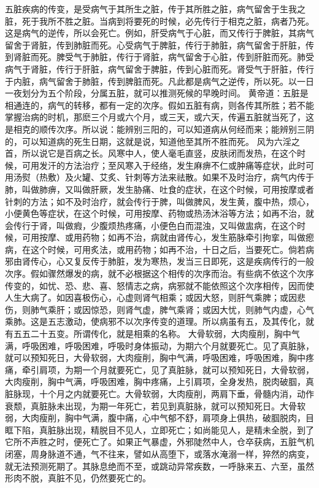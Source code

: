 \documentclass[a4paper,12pt,UTF8,twoside]{ctexbook}
\begin{document}
五脏疾病的传变，是受病气于其所生之脏，传于其所胜之脏，病气留舍于生我之脏，死于我所不胜之脏。当病到将要死的时候，必先传行于相克之脏，病者乃死。这是病气的逆传，所以会死亡。例如，肝受病气于心脏，而又传行于脾脏，其病气留舍于肾脏，传到肺脏而死。心受病气于脾脏，传行于肺脏，病气留舍于肝脏，传到肾脏而死。脾受气于肺脏，传行于肾脏，病气留舍于心脏，传到肝脏而死。肺受病气于肾脏，传行于肝脏，病气留舍于脾脏，传到心脏而死。肾受气于肝脏，传行于内脏，病气留舍于肺脏，传到脾脏而死。凡此都是病气之逆传，所以死。以一日一夜划分为五个阶段，分属五脏，就可以推测死候的早晚时间。
黄帝道：五脏是相通连的，病气的转移，都有一定的次序。假如五脏有病，则各传其所胜；若不能掌握治病的时机，那麽三个月或六个月，或三天，或六天，传遍五脏就当死了，这是相克的顺传次序。所以说：能辨别三阳的，可以知道病从何经而来；能辨别三阴的，可以知道病的死生日期，这就是说，知道他至其所不胜而死。
风为六淫之首，所以说它是百病之长。风寒中人，使人毫毛直竖，皮肤闭而发热，在这个时候，可用发汗的方法治疗；至风寒入于经络，发生麻痹不仁或肿痛等症状，此时可用汤熨（热敷）及火罐、艾炙、针刺等方法来祛散。如果不及时治疗，病气内传于肺，叫做肺痹，又叫做肝厥，发生胁痛、吐食的症状，在这个时候，可用按摩或者针刺的方法；如不及时治疗，就会传行于脾，叫做脾风，发生黄，腹中热，烦心，小便黄色等症状，在这个时候，可用按摩、药物或热汤沐浴等方法；如再不治，就会传行于肾，叫做瘕，少腹烦热疼痛，小便色白而混浊，又叫做盅病，在这个时候，可用按摩、或用药物；如再不治，病就由肾传心，发生筋脉牵引拘挛，叫做瘛病，在这个时候，可用炙法，或用药物；如再不治，十日之后，当要死亡。倘若病邪由肾传心，心又复反传于肺脏，发为寒热，发当三日即死，这是疾病传行的一般次序。假如骤然爆发的病，就不必根据这个相传的次序而治。有些病不依这个次序传变的，如忧、恐、悲、喜、怒情志之病，病邪就不能依照这个次序相传，因而使人生大病了。如因喜极伤心，心虚则肾气相乘；或因大怒，则肝气乘脾；或因悲伤，则肺气乘肝；或因惊恐，则肾气虚，脾气乘肾；或因大忧，则肺气内虚，心气乘肺。这是五志激动，使病邪不以次序传变的道理。所以病虽有五，及其传化，就有五五二十五变。所谓传化，就是相乘的名称。
大骨软弱，大肉瘦削，胸中气满，呼吸困难，呼吸困难，呼吸时身体振动，为期六个月就要死亡。见了真脏脉，就可以预知死日，大骨软弱，大肉瘦削，胸中气满，呼吸困难，呼吸困难，胸中疼痛，牵引肩项，为期一个月就要死亡，见了真脏脉，就可以预知死日，大骨软弱，大肉瘦削，胸中气满，呼吸困难，胸中疼痛，上引肩项，全身发热，脱肉破腘，真脏脉现，十个月之内就要死亡。大骨软弱，大肉瘦削，两肩下垂，骨髓内消，动作衰颓，真脏脉未出现，为期一年死亡，若见到真脏脉，就可以预知死日。大骨软弱，大肉瘦削，胸中气满，腹中痛，心中气郁不舒，肩项身上俱热，破腘脱肉，目眶下陷，真脏脉出现，精脱目不见人，立即死亡；如尚能见人，是精未全脱，到了它所不声胜之时，便死亡了。如果正气暴虚，外邪陡然中人，仓卒获病，五脏气机闭塞，周身脉道不通，气不往来，譬如从高堕下，或落水淹溺一样，猝然的病变，就无法预测死期了。其脉息绝而不至，或跳动异常疾数，一呼脉来五、六至，虽然形肉不脱，真脏不见，仍然要死亡的。
\end{document}

